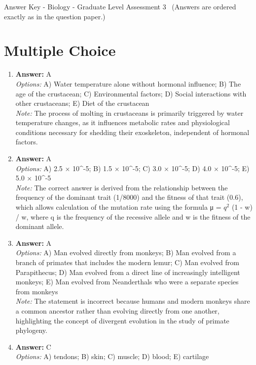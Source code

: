 \documentclass[12pt]{article}
\begin{document}
\begin{center}
Answer Key - Biology - Graduate Level Assessment 3 \
\small (Answers are ordered exactly as in the question paper.)
\end{center}

\section*{Multiple Choice}
\begin{enumerate}[label=\arabic*.]
\item \textbf{Answer:} A
\\ \textit{Options:} A) Water temperature alone without hormonal influence; B) The age of the crustacean; C) Environmental factors; D) Social interactions with other crustaceans; E) Diet of the crustacean
\\ \textit{Note:} The process of molting in crustaceans is primarily triggered by water temperature changes, as it influences metabolic rates and physiological conditions necessary for shedding their exoskeleton, independent of hormonal factors.
\item \textbf{Answer:} A
\\ \textit{Options:} A) 2.5 \ensuremath{\times} 10^-5; B) 1.5 \ensuremath{\times} 10^-5; C) 3.0 \ensuremath{\times} 10^-5; D) 4.0 \ensuremath{\times} 10^-5; E) 5.0 \ensuremath{\times} 10^-5
\\ \textit{Note:} The correct answer is derived from the relationship between the frequency of the dominant trait (1/8000) and the fitness of that trait (0.6), which allows calculation of the mutation rate using the formula μ = $q^2$ (1 - w) / w, where q is the frequency of the recessive allele and w is the fitness of the dominant allele.
\item \textbf{Answer:} A
\\ \textit{Options:} A) Man evolved directly from monkeys; B) Man evolved from a branch of primates that includes the modern lemur; C) Man evolved from Parapithecus; D) Man evolved from a direct line of increasingly intelligent monkeys; E) Man evolved from Neanderthals who were a separate species from monkeys
\\ \textit{Note:} The statement is incorrect because humans and modern monkeys share a common ancestor rather than evolving directly from one another, highlighting the concept of divergent evolution in the study of primate phylogeny.
\item \textbf{Answer:} C
\\ \textit{Options:} A) tendons; B) skin; C) muscle; D) blood; E) cartilage

\end{enumerate}
\end{document}
